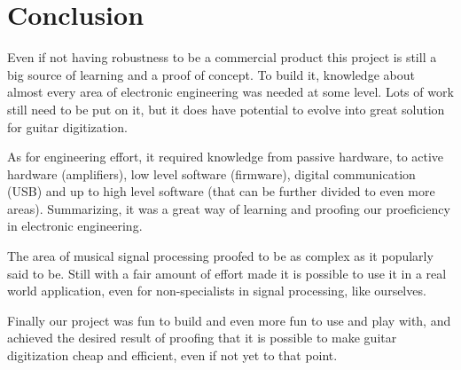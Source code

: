 \chapter[Conclusion]{Conclusion}
Even if not having robustness to be a commercial product this project is still a big source
of learning and a proof of concept. To build it, knowledge about almost every area
of electronic engineering was needed at some level. Lots of work still need to be put on it,
but it does have potential to evolve into great solution for guitar digitization.

As for engineering effort, it required knowledge from passive hardware, to active hardware
(amplifiers), low level software (firmware), digital communication (USB) and up to high
level software (that can be further divided to even more areas). Summarizing, it was
a great way of learning and proofing our proeficiency in electronic engineering.

The area of musical signal processing proofed to be as complex as it popularly said to be.
Still with a fair amount of effort made it is possible to use it in a real world application,
even for non-specialists in signal processing, like ourselves.

Finally our project was fun to build and even more fun to use and play with, and achieved
the desired result of proofing that it is possible to make guitar digitization cheap and
efficient, even if not yet to that point.